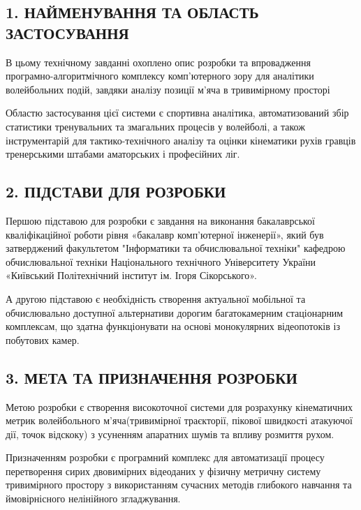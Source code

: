 

\begin{unnumbered}

\subsection{1. НАЙМЕНУВАННЯ ТА ОБЛАСТЬ ЗАСТОСУВАННЯ}
В цьому технічному завданні охоплено опис розробки та впровадження програмно-алгоритмічного комплексу комп'ютерного
зору для аналітики волейбольних подій, завдяки аналізу позиції м'яча в тривимірному просторі

Областю застосування цієї системи є спортивна аналітика, автоматизований збір статистики тренувальних та змагальних
процесів у волейболі, а також інструментарій для тактико-технічного аналізу та оцінки кінематики рухів гравців
тренерськими штабами аматорських і професійних ліг.

\subsection{2. ПІДСТАВИ ДЛЯ РОЗРОБКИ}

Першою підставою для розробки є завдання на виконання бакалаврської кваліфікаційної роботи рівня «бакалавр комп'ютерної
інженерії», який був затверджений факультетом "Інформатики та обчислювальної техніки" кафедрою обчислювальної техніки
Національного технічного Університету України «Київський Політехнічний інститут ім. Ігоря Сікорського».

А другою підставою є необхідність створення актуальної мобільної та обчислювально доступної альтернативи дорогим
багатокамерним стаціонарним комплексам, що здатна функціонувати на основі монокулярних відеопотоків із побутових камер.

\subsection{3. МЕТА ТА ПРИЗНАЧЕННЯ РОЗРОБКИ}

Метою розробки є створення високоточної системи для розрахунку кінематичних метрик волейбольного м'яча(тривимірної
траєкторії, пікової швидкості атакуючої дії, точок відскоку) з усуненням апаратних шумів та впливу розмиття рухом.

Призначенням розробки є програмний комплекс для автоматизації процесу перетворення сирих двовимірних відеоданих у
фізичну метричну систему тривимірного простору з використанням сучасних методів глибокого навчання та ймовірнісного
нелінійного згладжування.


\end{unnumbered}
